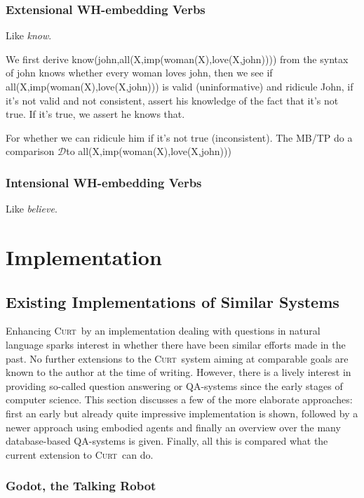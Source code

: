 \documentclass[a4paper]{article}
\newcommand{\pn}{\textsc} %
\newcommand{\Disc}{\ensuremath{\mathcal{D}}} %
\newcommand{\curt}{\pn{Curt}\mbox{ }}
\begin{document}
\subsubsection{Extensional WH-embedding Verbs}

Like \emph{know}.

We first derive know(john,all(X,imp(woman(X),love(X,john)))) from the syntax of
john knows whether every woman loves john, then we see if
all(X,imp(woman(X),love(X,john))) is valid (uninformative) and ridicule John, if
it's not valid and not consistent, assert his knowledge of the fact that it's
not true. If it's true, we assert he knows that.

For whether we can ridicule him if it's not true (inconsistent).
The MB/TP do a comparison \Disc to all(X,imp(woman(X),love(X,john)))

\subsubsection{Intensional WH-embedding Verbs}

Like \emph{believe}.

\section{Implementation}

\subsection{Existing Implementations of Similar Systems}\label{sec:othercrap}

Enhancing \curt by an implementation dealing with questions in natural language
sparks interest in whether there have been similar efforts made in the past. No
further extensions to the \curt system aiming at comparable goals are known to the
author at the time of writing. However, there is a lively interest in providing
so-called question answering or QA-systems since the early stages of computer
science. %
This section discusses a few of the more elaborate approaches: first an early
but already quite impressive implementation is shown, followed by a newer approach
using embodied agents and finally an overview over the many database-based
QA-systems is given. Finally, all this is compared what the current extension to
\curt can do.


\subsubsection{Godot, the Talking Robot}
\end{document}
